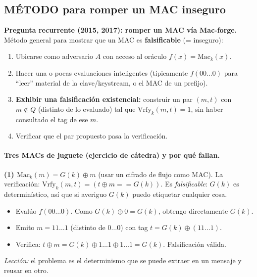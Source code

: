 \documentclass[../main.tex]{subfiles}
\begin{document}
\subsection{MÉTODO para romper un MAC inseguro}

\begin{examen}
\textbf{Pregunta recurrente (2015, 2017): romper un MAC vía Mac-forge.}\\
Método general para mostrar que un MAC es \textbf{falsificable} (= inseguro):
\begin{enumerate}[leftmargin=1.6em]
  \item Ubicarse como adversario $A$ con acceso al oráculo $f(x)=\mathrm{Mac}_k(x)$.
  \item Hacer una o pocas evaluaciones inteligentes (típicamente $f(00\ldots0)$ para
  ``leer'' material de la clave/keystream, o el MAC de un prefijo).
  \item \textbf{Exhibir una falsificación existencial:} construir un par $(m,t)$
  con $m \notin Q$ (distinto de lo evaluado) tal que $\mathrm{Vrfy}_k(m,t)=1$, sin
  haber consultado el tag de ese $m$.
  \item Verificar que el par propuesto pasa la verificación.
\end{enumerate}
\end{examen}

\paragraph{Tres MACs de juguete (ejercicio de cátedra) y por qué fallan.}

\textbf{(1) $\mathrm{Mac}_k(m) = G(k) \oplus m$} (usar un cifrado de flujo como MAC).
La verificación: $\mathrm{Vrfy}_k(m,t) = (t \oplus m == G(k))$. Es \emph{falsificable}:
$G(k)$ es determinístico, así que si averiguo $G(k)$ puedo etiquetar cualquier cosa.
\begin{itemize}[leftmargin=1.4em,nosep]
  \item Evalúo $f(00\ldots0)$. Como $G(k)\oplus 0 = G(k)$, obtengo directamente $G(k)$.
  \item Emito $m=11\ldots1$ (distinto de $0\ldots0$) con tag $t = G(k)\oplus(11\ldots1)$.
  \item Verifica: $t \oplus m = G(k)\oplus 1\ldots1 \oplus 1\ldots1 = G(k)$. Falsificación válida.
\end{itemize}
\emph{Lección:} el problema es el determinismo que se puede extraer en un mensaje y
reusar en otro.
\end{document}
